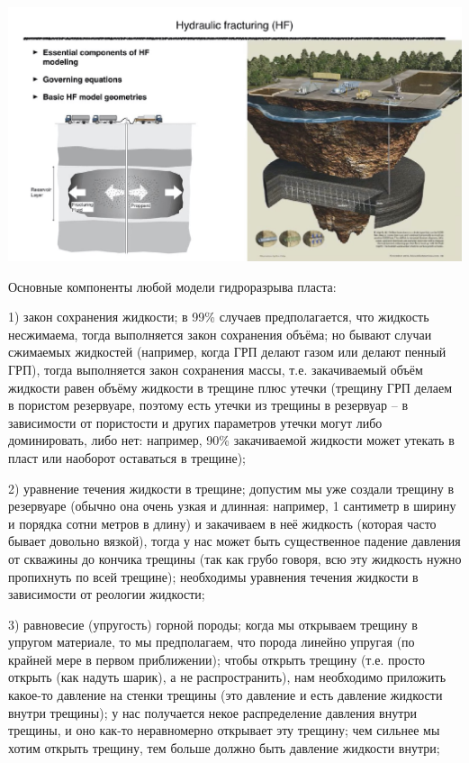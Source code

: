 \documentclass[main.tex]{subfiles}
\begin{document}
\includegraphics[width=\textwidth, page=2]{HF_slides.pdf}

Основные компоненты любой модели гидроразрыва пласта:

1) закон сохранения жидкости; в 99\% случаев предполагается, что жидкость несжимаема, тогда выполняется закон сохранения объёма; но бывают случаи сжимаемых жидкостей (например, когда ГРП делают газом или делают пенный ГРП), тогда выполняется закон сохранения массы, т.е. закачиваемый объём жидкости равен объёму жидкости в трещине плюс утечки (трещину ГРП делаем в пористом резервуаре, поэтому есть утечки из трещины в резервуар -- в зависимости от пористости и других параметров утечки могут либо доминировать, либо нет: например, 90\% закачиваемой жидкости может утекать в пласт или наоборот оставаться в трещине);

2) уравнение течения жидкости в трещине;
допустим мы уже создали трещину в резервуаре (обычно она очень узкая и длинная: например, 1 сантиметр в ширину и порядка сотни метров в длину) и закачиваем в неё жидкость (которая часто бывает довольно вязкой), тогда у нас может быть существенное падение давления от скважины до кончика трещины (так как грубо говоря, всю эту жидкость нужно пропихнуть по всей трещине);
необходимы уравнения течения жидкости в зависимости от реологии жидкости;

3) равновесие (упругость) горной породы;
когда мы открываем трещину в упругом материале, то мы предполагаем, что порода линейно упругая (по крайней мере в первом приближении);
чтобы открыть трещину (т.е. просто открыть (как надуть шарик), а не распространить), нам необходимо приложить какое-то давление на стенки трещины (это давление и есть давление жидкости внутри трещины);
у нас получается некое распределение давления внутри трещины, и оно как-то неравномерно открывает эту трещину; чем сильнее мы хотим открыть трещину, тем больше должно быть давление жидкости внутри;
\end{document}
